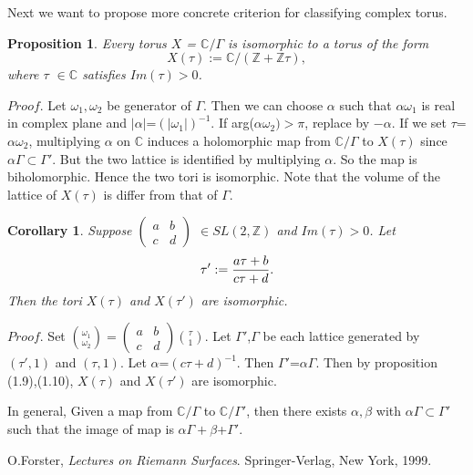 \documentclass[11pt]{amsart}
\newtheorem{cor}[thm]{Corollary}
\newtheorem{prop}[thm]{Proposition}
\theoremstyle{definition}
\begin{document}
Next we want to propose more concrete criterion for classifying complex torus.
\begin{prop} Every torus $X$ = $\mathbb{C}/\Gamma$ is isomorphic to a torus of the form 
\begin{equation*} X(\tau):=\mathbb{C}/(\mathbb{Z}+\mathbb{Z}\tau),
\end{equation*}
where $\tau$ $\in \mathbb{C}$ satisfies $Im(\tau)>0$.
\end{prop}
$Proof$. Let $\omega_1, \omega_2$ be generator of $\Gamma$. Then we can choose $\alpha$ such that $\alpha\omega_1$ is real in complex plane and $\left\vert \alpha \right\vert$=$(\left\vert \omega_1 \right\vert)^{-1}$. If arg($\alpha\omega_2) > \pi$, replace by $-\alpha$.
If we set $\tau$=$\alpha\omega_2$, multiplying $\alpha$ on $\mathbb{C}$ induces a holomorphic map from $\mathbb{C}/\Gamma$ to $X(\tau)$ since $\alpha\Gamma \subset \Gamma'$. But the two lattice is identified by multiplying $\alpha$. So the map is biholomorphic. Hence the two tori is isomorphic. Note that the volume of the lattice of $X(\tau)$ is differ from that of $\Gamma$.



\begin{cor} Suppose $\begin{pmatrix} a & b \\ c & d \end{pmatrix}$ $\in SL(2,\mathbb{Z})$ and $Im(\tau)>0$. Let
\begin{equation*} \tau':={a\tau+b \over c\tau+d}.
\end{equation*}
Then the tori $X(\tau)$ and $X(\tau')$ are isomorphic.
\end{cor}
$Proof$.  Set ${\omega_1 \choose \omega_2 }=\begin{pmatrix} a & b \\ c & d \end{pmatrix}$${\tau \choose 1}$. Let $\Gamma'$,$\Gamma$ be each lattice generated by $(\tau',1)$ and $(\tau,1)$. Let $\alpha $=$(c\tau+d)^{-1}$. Then $\Gamma'$=$\alpha\Gamma$.
Then by proposition (1.9),(1.10), $X(\tau)$ and $X(\tau')$ are isomorphic.  
\vspace{2ex}

In general, Given a map from $\mathbb{C}/\Gamma$ to $\mathbb{C}/\Gamma'$, then there exists $\alpha,\beta$ with $\alpha\Gamma \subset \Gamma'$ such that the image of map is $\alpha\Gamma+\beta$+$\Gamma'$.  
 

\begin{thebibliography}{30}
O.Forster, \emph{Lectures on Riemann Surfaces}. Springer-Verlag, New York, 1999.


\end{thebibliography}
\end{document}
